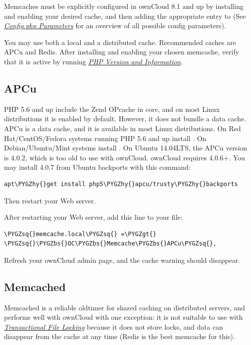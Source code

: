 \documentclass[letterpaper,10pt,english]{sphinxmanual}
\def\PYGZbs{\char`\\}
\def\PYGZgt{\char`\>}
\def\PYGZhy{\char`\-}
\def\PYGZsq{\char`\'}
\renewcommand\PYGZsq{\textquotesingle}
\begin{document}
Memcaches must be explicitly configured in ownCloud 8.1 and up by installing
and enabling your desired cache, and then adding the appropriate entry to
 (See {\hyperref[configuration_server/config_sample_php_parameters::doc]{\emph{\emph{Config.php Parameters}}}} for an overview of
all possible config parameters).

You may use both a local and a distributed cache. Recommended caches are APCu
and Redis. After installing and enabling your chosen memcache, verify that it is
active by running {\hyperref[issues/general_troubleshooting:label\string-phpinfo]{\emph{PHP Version and Information}}}.


\subsection{APCu}
\label{configuration_server/caching_configuration:id1}
PHP 5.6 and up include the Zend OPcache in core, and on most Linux
distributions it is enabled by default. However, it does
not bundle a data cache. APCu is a data cache, and it is available in most
Linux distributions. On Red Hat/CentOS/Fedora systems running PHP 5.6 and up
install . On Debian/Ubuntu/Mint systems install .
On Ubuntu 14.04LTS, the APCu version is 4.0.2, which is too old to use with ownCloud. ownCloud requires 4.0.6+. You may install 4.0.7 from Ubuntu backports with this command:

\begin{Verbatim}[commandchars=\\\{\}]
apt\PYGZhy{}get install php5\PYGZhy{}apcu/trusty\PYGZhy{}backports
\end{Verbatim}

Then restart your Web server.

After restarting your Web server, add this line to your  file:

\begin{Verbatim}[commandchars=\\\{\}]
\PYGZsq{}memcache.local\PYGZsq{} =\PYGZgt{} \PYGZsq{}\PYGZbs{}OC\PYGZbs{}Memcache\PYGZbs{}APCu\PYGZsq{},
\end{Verbatim}

Refresh your ownCloud admin page, and the cache warning should disappear.


\subsection{Memcached}
\label{configuration_server/caching_configuration:id2}
Memcached is a reliable oldtimer for shared caching on distributed servers,
and performs well with ownCloud with one exception: it is not suitable to use
with {\hyperref[configuration_files/files_locking_transactional::doc]{\emph{\emph{Transactional File Locking}}}}
because it does not store locks, and data can disappear from the cache at any time
(Redis is the best memcache for this).
\end{document}
